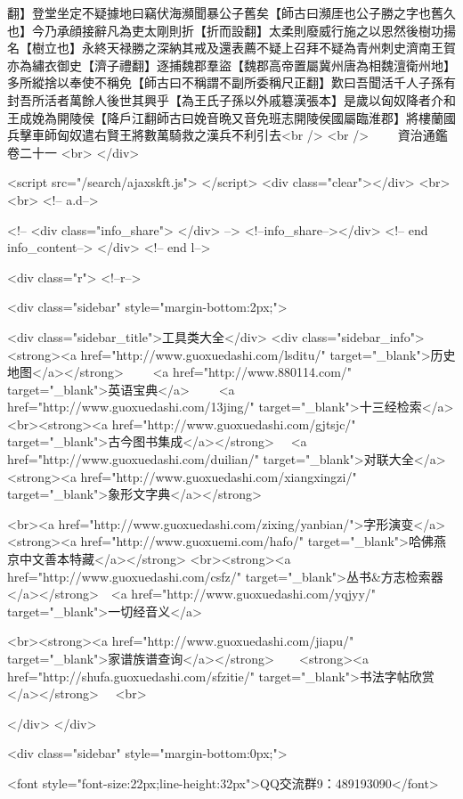 翻】登堂坐定不疑據地曰竊伏海瀕聞暴公子舊矣【師古曰瀕厓也公子勝之字也舊久也】今乃承顔接辭凡為吏太剛則折【折而設翻】太柔則廢威行施之以恩然後樹功揚名【樹立也】永終天禄勝之深納其戒及還表薦不疑上召拜不疑為青州刺史濟南王賀亦為繡衣御史【濟子禮翻】逐捕魏郡羣盜【魏郡高帝置屬冀州唐為相魏澶衛州地】多所縱捨以奉使不稱免【師古曰不稱謂不副所委稱尺正翻】歎曰吾聞活千人子孫有封吾所活者萬餘人後世其興乎【為王氏子孫以外戚簒漢張本】是歲以匈奴降者介和王成娩為開陵侯【降戶江翻師古曰娩音晩又音免班志開陵侯國屬臨淮郡】將樓蘭國兵擊車師匈奴遣右賢王將數萬騎救之漢兵不利引去<br />
<br />
　　資治通鑑卷二十一  <br>
   </div> 

<script src="/search/ajaxskft.js"> </script>
 <div class="clear"></div>
<br>
<br>
 <!-- a.d-->

 <!--
<div class="info_share">
</div> 
-->
 <!--info_share--></div>   <!-- end info_content-->
  </div> <!-- end l-->

<div class="r">   <!--r-->



<div class="sidebar"  style="margin-bottom:2px;">

 
<div class="sidebar_title">工具类大全</div>
<div class="sidebar_info">
<strong><a href="http://www.guoxuedashi.com/lsditu/" target="_blank">历史地图</a></strong>　　
<a href="http://www.880114.com/" target="_blank">英语宝典</a>　　
<a href="http://www.guoxuedashi.com/13jing/" target="_blank">十三经检索</a>　
<br><strong><a href="http://www.guoxuedashi.com/gjtsjc/" target="_blank">古今图书集成</a></strong>　
<a href="http://www.guoxuedashi.com/duilian/" target="_blank">对联大全</a>　<strong><a href="http://www.guoxuedashi.com/xiangxingzi/" target="_blank">象形文字典</a></strong>　

<br><a href="http://www.guoxuedashi.com/zixing/yanbian/">字形演变</a>　　<strong><a href="http://www.guoxuemi.com/hafo/" target="_blank">哈佛燕京中文善本特藏</a></strong>
<br><strong><a href="http://www.guoxuedashi.com/csfz/" target="_blank">丛书&方志检索器</a></strong>　<a href="http://www.guoxuedashi.com/yqjyy/" target="_blank">一切经音义</a>　　

<br><strong><a href="http://www.guoxuedashi.com/jiapu/" target="_blank">家谱族谱查询</a></strong>　　<strong><a href="http://shufa.guoxuedashi.com/sfzitie/" target="_blank">书法字帖欣赏</a></strong>　
<br>

</div>
</div>


<div class="sidebar" style="margin-bottom:0px;">

<font style="font-size:22px;line-height:32px">QQ交流群9：489193090</font>


